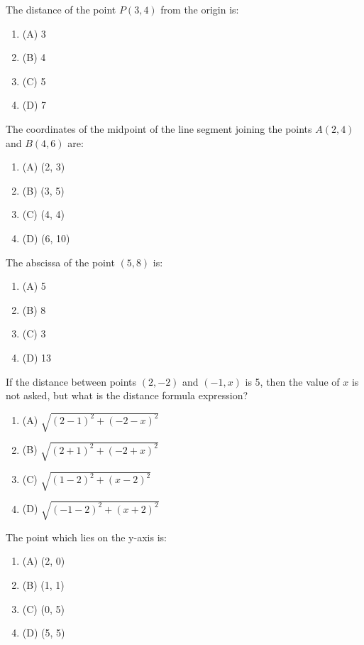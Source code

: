 \documentclass[12pt,a4paper]{exam}
\begin{document}
\begin{questions}
\question[1] The distance of the point $P(3, 4)$ from the origin is:
\begin{enumerate}[label=(\Alph*)]
  \item (A) 3
  \item (B) 4
  \item (C) 5
  \item (D) 7
\end{enumerate}
\vspace{0.15cm}

\question[1] The coordinates of the midpoint of the line segment joining the points $A(2, 4)$ and $B(4, 6)$ are:
\begin{enumerate}[label=(\Alph*)]
  \item (A) (2, 3)
  \item (B) (3, 5)
  \item (C) (4, 4)
  \item (D) (6, 10)
\end{enumerate}
\vspace{0.15cm}

\question[1] The abscissa of the point $(5, 8)$ is:
\begin{enumerate}[label=(\Alph*)]
  \item (A) 5
  \item (B) 8
  \item (C) 3
  \item (D) 13
\end{enumerate}
\vspace{0.15cm}

\question[1] If the distance between points $(2, -2)$ and $(-1, x)$ is 5, then the value of $x$ is not asked, but what is the distance formula expression?
\begin{enumerate}[label=(\Alph*)]
  \item (A) $\sqrt{(2-1)^2 + (-2-x)^2}$
  \item (B) $\sqrt{(2+1)^2 + (-2+x)^2}$
  \item (C) $\sqrt{(1-2)^2 + (x-2)^2}$
  \item (D) $\sqrt{(-1-2)^2 + (x+2)^2}$
\end{enumerate}
\vspace{0.15cm}

\question[1] The point which lies on the y-axis is:
\begin{enumerate}[label=(\Alph*)]
  \item (A) (2, 0)
  \item (B) (1, 1)
  \item (C) (0, 5)
  \item (D) (5, 5)
\end{enumerate}
\vspace{0.15cm}


\end{questions}
\end{document}
